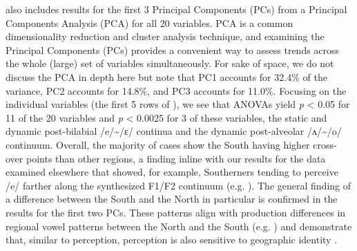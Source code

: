 \documentclass[output=paper]{LSP/langsci}
\begin{document}
 also includes  results for the first 3 Principal Components (PCs) from a Principal Components Analysis (PCA) for all 20 variables. PCA is a common dimensionality reduction and cluster analysis technique, and examining the Principal Components (PCs) provides a convenient way to assess trends across the whole (large) set of variables simultaneously. For sake of space, we do not discuss the PCA in depth here but note that PC1 accounts for 32.4\% of the variance, PC2 accounts for 14.8\%, and PC3 accounts for 11.0\%. Focusing on the individual variables (the first 5 rows of ), we see that ANOVAs yield \textit{p }{\textless} 0.05 for 11 of the 20 variables and \textit{p }{\textless} 0.0025 for 3 of these variables, the static and dynamic post-bilabial /e/{\textasciitilde}/ɛ/ continua and the dynamic post-alveolar /ʌ/{\textasciitilde}/o/ continuum. Overall, the majority of cases show the South having higher cross-over points than other regions, a finding inline with our results for the data examined elsewhere that showed, for example, Southerners tending to perceive /e/ farther along the synthesized F1/F2 continuum (e.g. \citealt{kendall_variation_2012}). The general finding of a difference between the South and the North in particular is confirmed in the results for the first two PCs. These patterns align with production differences in regional vowel patterns between the North and the South (e.g. \citealt{labov_atlas_2006-1}) and demonstrate that, similar to perception, perception is also sensitive to geographic identity \citep{fridland_exploring_2012}.
\end{document}
